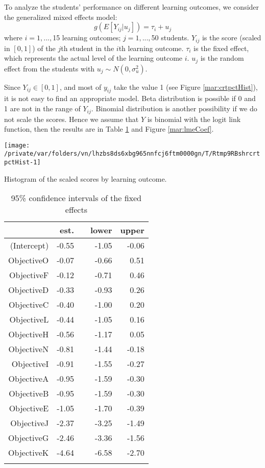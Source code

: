 \documentclass[12pt,english,nohyper]{tufte-handout}\usepackage[]{graphicx}\usepackage[]{color}
\newenvironment{knitrout}{}{} %
\begin{document}
To analyze the students' performance on different learning outcomes, we consider the generalized mixed effects model:
\[
g(E[Y_{ij}|u_{j}])= \tau_{i}+u_{j}
\]
where $i=1,...,$15 learning outcomes;
$j=1,...,$50 students. $Y_{ij}$ is the score (scaled in $[0,1]$) of
the $j$th student in the $i$th learning outcome. $\tau_i$ is the fixed effect,
which represents the actual level of the learning outcome $i$.
$u_j$ is the random effect from the students with
$u_{j} \sim N(0,\sigma_{u}^{2})$.

Since $Y_{ij} \in [0,1]$, and most of $y_{ij}$ take the value 1
(see Figure \ref{mar:crtpctHist}), it is not easy to find an appropriate model.
Beta distribution is possible if 0 and 1 are not in the range of $Y_{ij}$.
Binomial distribution is another possibility if we do not scale the scores.
Hence we assume that $Y$ is binomial with the logit link function,
then the results are in Table \ref{tab:lme_fixed} and Figure \ref{mar:lmeCoef}.

\begin{knitrout}
\color{fgcolor}\begin{marginfigure}
\texttt{[image: /private/var/folders/vn/lhzbs8ds6xbg965nnfcj6ftm0000gn/T/Rtmp9RBshrcrtpctHist-1]} \caption[Histogram of the scaled scores by learning outcome]{Histogram of the scaled scores by learning outcome.}\label{mar:crtpctHist}
\end{marginfigure}


\end{knitrout}

\begin{longtable}{rrlrr}
  \hline
 & est. &    & lower & upper \\ 
  \hline
(Intercept) & -0.55 &  & -1.05 & -0.06 \\ 
  ObjectiveO & -0.07 &  & -0.66 & 0.51 \\ 
  ObjectiveF & -0.12 &  & -0.71 & 0.46 \\ 
  ObjectiveD & -0.33 &  & -0.93 & 0.26 \\ 
  ObjectiveC & -0.40 &  & -1.00 & 0.20 \\ 
  ObjectiveL & -0.44 &  & -1.05 & 0.16 \\ 
  ObjectiveH & -0.56 &  & -1.17 & 0.05 \\ 
  ObjectiveN & -0.81 &  & -1.44 & -0.18 \\ 
  ObjectiveI & -0.91 &  & -1.55 & -0.27 \\ 
  ObjectiveA & -0.95 &  & -1.59 & -0.30 \\ 
  ObjectiveB & -0.95 &  & -1.59 & -0.30 \\ 
  ObjectiveE & -1.05 &  & -1.70 & -0.39 \\ 
  ObjectiveJ & -2.37 &  & -3.25 & -1.49 \\ 
  ObjectiveG & -2.46 &  & -3.36 & -1.56 \\ 
  ObjectiveK & -4.64 &  & -6.58 & -2.70 \\ 
   \hline
\hline
\caption{95\% confidence intervals of the fixed effects} 
\label{tab:lme_fixed}
\end{longtable}
\end{document}
